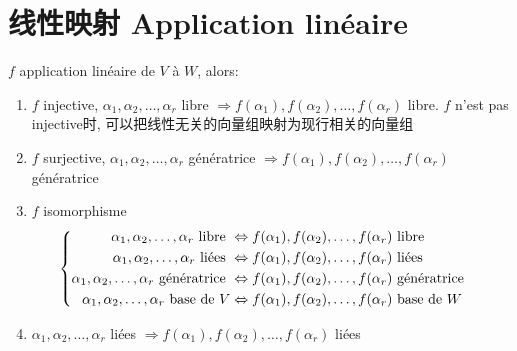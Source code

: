 \chapter{线性映射 Application lin\'eaire}
$f$ application lin\'eaire de $V$ \`a $W$, alors:
\begin{enumerate}
\item $f$ injective, $\alpha_1, \alpha_2, \ldots, \alpha_r$ libre $\Rightarrow f(\alpha_1), f(\alpha_2), \ldots, f(\alpha_r)$ libre.
	$f$ n'est pas injective时, 可以把线性无关的向量组映射为现行相关的向量组
\item $f$ surjective, $\alpha_1, \alpha_2, \ldots, \alpha_r$ g\'en\'eratrice $\Rightarrow f(\alpha_1), f(\alpha_2), \ldots, f(\alpha_r)$ g\'en\'eratrice 
\item $f$ isomorphisme
	$$
	\begin{cases}
	\begin{aligned}
			\alpha_1, \alpha_2, \ldots, \alpha_r \text{ libre } & \Leftrightarrow f(\alpha_1), f(\alpha_2), \ldots, f(\alpha_r) \text{ libre } \\
	\alpha_1, \alpha_2, \ldots, \alpha_r \text{ li\'ees } & \Leftrightarrow f(\alpha_1), f(\alpha_2), \ldots, f(\alpha_r) \text{ li\'ees } \\
	\alpha_1, \alpha_2, \ldots, \alpha_r \text{ g\'en\'eratrice } & \Leftrightarrow f(\alpha_1), f(\alpha_2), \ldots, f(\alpha_r) \text{ g\'en\'eratrice } \\
	\alpha_1, \alpha_2, \ldots, \alpha_r \text{ base de } V & \Leftrightarrow f(\alpha_1), f(\alpha_2), \ldots, f(\alpha_r) \text{ base de } W
	\end{aligned}
	\end{cases}
	$$
\item $\alpha_1, \alpha_2, \ldots, \alpha_r$ li\'ees $\Rightarrow f(\alpha_1), f(\alpha_2), \ldots, f(\alpha_r)$ li\'ees
\end{enumerate}

